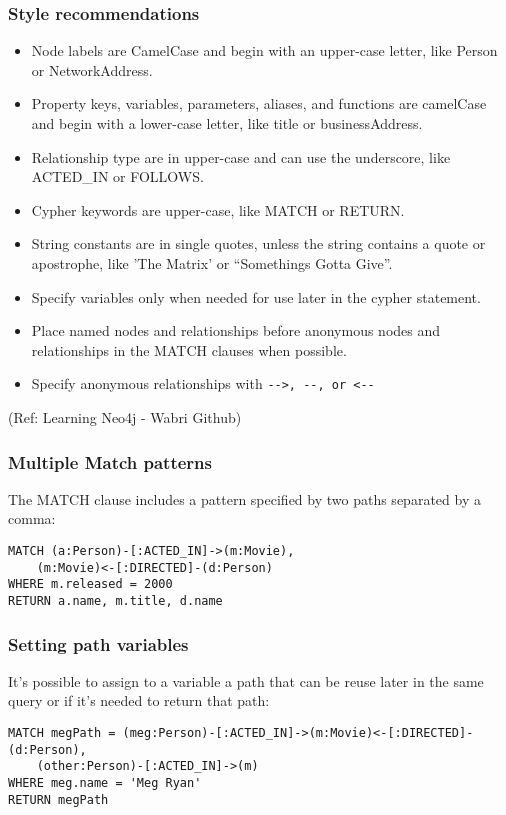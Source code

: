 \begin{frame}\frametitle{Style recommendations}

\begin{itemize}
\item Node labels are CamelCase and begin with an upper-case letter, like Person or NetworkAddress.
\item Property keys, variables, parameters, aliases, and functions are camelCase and begin with a lower-case letter, like title or businessAddress.
\item Relationship type are in upper-case and can use the underscore, like ACTED\_IN or FOLLOWS.
\item Cypher keywords are upper-case, like MATCH or RETURN.
\item String constants are in single quotes, unless the string contains a quote or apostrophe, like 'The Matrix' or ``Somethings Gotta Give''.
\item Specify variables only when needed for use later in the cypher statement.
\item Place named nodes and relationships before anonymous nodes and relationships in the MATCH clauses when possible.
\item Specify anonymous relationships with \lstinline|-->, --, or <--|
\end{itemize}

{\tiny (Ref: Learning Neo4j - Wabri Github)}
\end{frame}

\begin{frame}[fragile]\frametitle{Multiple Match patterns}

The MATCH clause includes a pattern specified by two paths separated by a comma:

\begin{lstlisting}
MATCH (a:Person)-[:ACTED_IN]->(m:Movie),
    (m:Movie)<-[:DIRECTED]-(d:Person)
WHERE m.released = 2000
RETURN a.name, m.title, d.name
\end{lstlisting}

\end{frame}

\begin{frame}[fragile]\frametitle{Setting path variables}

It's possible to assign to a variable a path that can be reuse later in the same query or if it's needed to return that path:


\begin{lstlisting}
MATCH megPath = (meg:Person)-[:ACTED_IN]->(m:Movie)<-[:DIRECTED]-(d:Person),
    (other:Person)-[:ACTED_IN]->(m)
WHERE meg.name = 'Meg Ryan'
RETURN megPath
\end{lstlisting}

\end{frame}

